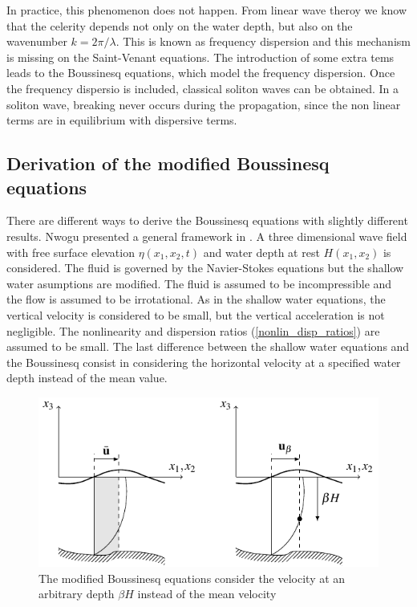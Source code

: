 In practice, this phenomenon does not happen. From linear wave theroy we know that the celerity depends not only on the water depth, but also on the wavenumber $k=2\pi/\lambda$. This is known as frequency dispersion and this mechanism is missing on the Saint-Venant equations. The introduction of some extra tems leads to the Boussinesq equations, which model the frequency dispersion. Once the frequency dispersio is included, classical soliton waves can be obtained. In a soliton wave, breaking never occurs during the propagation, since the non linear terms are in equilibrium with dispersive terms.


\subsection{Derivation of the modified Boussinesq equations}

There are different ways to derive the Boussinesq equations with slightly different results. Nwogu presented a general framework in \cite{nwogu1993}. A three dimensional wave field with free surface elevation $\eta(x_1, x_2, t)$ and water depth at rest $H(x_1, x_2)$ is considered. The fluid is governed by the Navier-Stokes equations but the shallow water asumptions are modified. The fluid is assumed to be incompressible and the flow is assumed to be irrotational. As in the shallow water equations, the vertical velocity is considered to be small, but the vertical acceleration is not negligible. The nonlinearity and dispersion ratios (\ref{nonlin_disp_ratios}) are assumed to be small. The last difference between the shallow water equations and the Boussinesq consist in considering the horizontal velocity at a specified water depth instead of the mean value.

\begin{figure}
    \centering
    \includegraphics[width=.9\textwidth]{img/velocity_beta.pdf}
    \caption{The modified Boussinesq equations consider the velocity at an arbitrary depth $\beta H$ instead of the mean velocity}
\end{figure}

